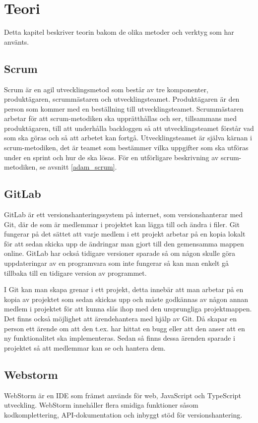 \chapter{Teori}
Detta kapitel beskriver teorin bakom de olika metoder och verktyg som har använts.

\section{Scrum} \label{scrum}
Scrum är en agil utvecklingsmetod som består av tre komponenter, produktägaren, scrummästaren och utvecklingsteamet. 
Produktägaren är den person som kommer med en beställning till utvecklingsteamet. 
Scrummästaren arbetar för att scrum-metodiken ska upprätthållas och ser, tillsammans med produktägaren, till att underhålla backloggen så att utvecklingsteamet förstår vad som ska göras och så att arbetet kan fortgå. 
Utvecklingsteamet är själva kärnan i scrum-metodiken, det är teamet som bestämmer vilka uppgifter som ska utföras under en sprint och hur de ska lösas. 
För en utförligare beskrivning av scrum-metodiken, se avsnitt \ref{adam_scrum}.

\section{GitLab}
GitLab är ett versionshanteringssystem på internet, som versionshanterar med Git, där de som är medlemmar i projektet kan lägga till och ändra i filer. 
Git fungerar på det sättet att varje medlem i ett projekt arbetar på en kopia lokalt för att sedan skicka upp de ändringar man gjort till den gemensamma mappen online. 
GitLab har också tidigare versioner sparade så om någon skulle göra uppdateringar av en programvara som inte fungerar så kan man enkelt gå tillbaka till en tidigare version av programmet.

I Git kan man skapa grenar i ett projekt, detta innebär att man arbetar på en kopia av projektet som sedan skickas upp och måste godkännas av någon annan medlem i projektet för att kunna slås ihop med den ursprungliga projektmappen. 
Det finns också möjlighet att ärendehantera med hjälp av Git. 
Då skapar en person ett ärende om att den t.ex. har hittat en bugg eller att den anser att en ny funktionalitet ska implementeras. 
Sedan så finns dessa ärenden sparade i projektet så att medlemmar kan se och hantera dem. \cite{gitlab}

\section{Webstorm}
WebStorm är en IDE som främst används för web, JavaScript och TypeScript utveckling. WebStorm innehåller flera smidiga funktioner såsom kodkomplettering, API-dokumentation och inbyggt stöd för versionshantering. \cite{webstorm}

